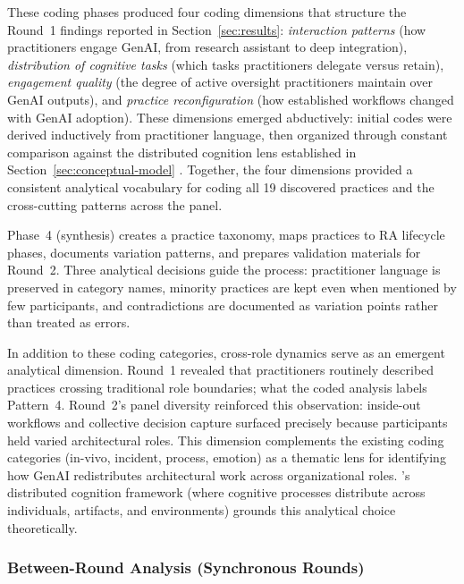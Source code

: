 These coding phases produced four coding dimensions that
structure the Round~1 findings reported in Section~\ref{sec:results}:
\emph{interaction patterns} (how practitioners engage GenAI, from research
assistant to deep integration), \emph{distribution of cognitive tasks} (which
tasks practitioners delegate versus retain), \emph{engagement quality} (the
degree of active oversight practitioners maintain over GenAI outputs), and
\emph{practice reconfiguration} (how established workflows changed with GenAI
adoption). These dimensions emerged abductively: initial codes were derived
inductively from practitioner language, then organized through constant
comparison against the distributed cognition lens established in
Section~\ref{sec:conceptual-model}
\parencite{charmaz_constructing_2014, patton_qualitative_2015}. Together, the
four dimensions provided a consistent analytical vocabulary for coding all 19
discovered practices and the cross-cutting patterns across the panel.

Phase~4 (synthesis) creates a practice taxonomy, maps practices to RA
lifecycle phases, documents variation patterns, and prepares validation
materials for Round~2. Three analytical decisions guide the process:
practitioner language is preserved in category names, minority practices are
kept even when mentioned by few participants, and contradictions are documented
as variation points rather than treated as errors.

In addition to these coding categories, cross-role dynamics serve as an
emergent analytical dimension. Round~1 revealed that practitioners routinely
described practices crossing traditional role boundaries; what the coded
analysis labels Pattern~4. Round~2's panel diversity reinforced this
observation: inside-out workflows and collective decision capture surfaced
precisely because participants held varied architectural roles. This dimension
complements the existing coding categories (in-vivo, incident, process,
emotion) as a thematic lens for identifying how GenAI redistributes
architectural work across organizational roles.
\textcite{hollan_distributed_2000}'s distributed cognition framework (where
cognitive processes distribute across individuals, artifacts, and
environments) grounds this analytical choice theoretically.

\subsubsection{Between-Round Analysis (Synchronous Rounds)}

